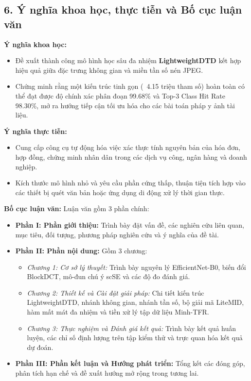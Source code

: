 \subsection{6. Ý nghĩa khoa học, thực tiễn và Bố cục luận văn}

\indent\indent \textbf{Ý nghĩa khoa học:}
\begin{itemize}
    \item Đề xuất thành công mô hình học sâu đa nhiệm \textbf{LightweightDTD} kết hợp hiệu quả giữa đặc trưng không gian và miền tần số nén JPEG.
    \item Chứng minh rằng một kiến trúc tinh gọn (~4.15 triệu tham số) hoàn toàn có thể đạt được độ chính xác phân đoạn 99.68\% và Top-3 Class Hit Rate 98.30\%, mở ra hướng tiếp cận tối ưu hóa cho các bài toán pháp y ảnh tài liệu.
\end{itemize}
\vspace{0.3cm}

\textbf{Ý nghĩa thực tiễn:}
\begin{itemize}
    \item Cung cấp công cụ tự động hóa việc xác thực tính nguyên bản của hóa đơn, hợp đồng, chứng minh nhân dân trong các dịch vụ công, ngân hàng và doanh nghiệp.
    \item Kích thước mô hình nhỏ và yêu cầu phần cứng thấp, thuận tiện tích hợp vào các thiết bị quét văn bản hoặc ứng dụng di động xử lý thời gian thực.
\end{itemize}
\vspace{0.3cm}

\textbf{Bố cục luận văn:}
Luận văn gồm 3 phần chính:
\begin{itemize}
    \item \textbf{Phần I: Phần giới thiệu:} Trình bày đặt vấn đề, các nghiên cứu liên quan, mục tiêu, đối tượng, phương pháp nghiên cứu và ý nghĩa của đề tài.
    \item \textbf{Phần II: Phần nội dung:} Gồm 3 chương:
    \begin{itemize}
        \item \textit{Chương 1: Cơ sở lý thuyết:} Trình bày nguyên lý EfficientNet-B0, biến đổi BlockDCT, mô-đun chú ý scSE và các độ đo đánh giá.
        \item \textit{Chương 2: Thiết kế và Cài đặt giải pháp:} Chi tiết kiến trúc LightweightDTD, nhánh không gian, nhánh tần số, bộ giải mã LiteMID, hàm mất mát đa nhiệm và tiền xử lý tập dữ liệu Minh-TFR.
        \item \textit{Chương 3: Thực nghiệm và Đánh giá kết quả:} Trình bày kết quả huấn luyện, các chỉ số định lượng trên tập kiểm thử và trực quan hóa kết quả dự đoán.
    \end{itemize}
    \item \textbf{Phần III: Phần kết luận và Hướng phát triển:} Tổng kết các đóng góp, phân tích hạn chế và đề xuất hướng mở rộng trong tương lai.
\end{itemize}
